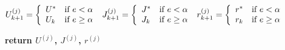 \documentclass[journal]{IEEEtran}
\begin{document}
\begin{algorithm}
\begin{algorithmic}[1]
\State $U_{k+1}^{(j)} = \left \{ \begin{array}{l l}
												U^{*} & \text{if} \ e < \alpha \\
												U_{k} & \text{if} \ e \geq \alpha \\
									  \end{array} \right .$			
\State $J_{k+1}^{(j)} = \left \{ \begin{array}{l l}
												J^{*} & \text{if} \ e < \alpha \\
												J_{k} & \text{if} \ e \geq \alpha \\
										  \end{array} \right .$
\State $r_{k+1}^{(j)} = \left \{ \begin{array}{l l}
												r^{*} & \text{if} \ e < \alpha \\
												r_{k} & \text{if} \ e \geq \alpha \\
										  \end{array} \right .$
			
		\EndFor	
	\EndFor
\State \textbf{return $U^{(j)}$, $J^{(j)}$, $r^{(j)}$}	
\EndFunction
\end{algorithmic}
\end{algorithm}
\end{document}
